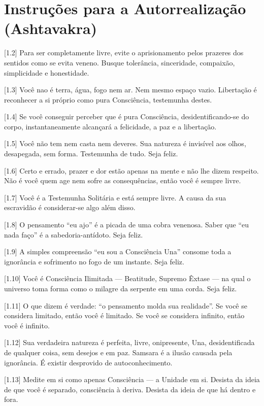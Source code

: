 \chapter[(Ashtavakra)]{Instruções para a Autorrealização (Ashtavakra)}

[1.2] Para ser completamente livre, evite o aprisionamento pelos prazeres dos sentidos como se evita veneno. Busque tolerância, sinceridade, compaixão, simplicidade e honestidade.

[1.3] Você nao é terra, água, fogo nem ar. Nem mesmo espaço vazio. Libertação é reconhecer a si próprio como pura Consciência, testemunha destes.

[1.4] Se você conseguir perceber que é pura Consciência, desidentificando-se do corpo, instantaneamente alcançará a felicidade, a paz e a libertação.

[1.5] Você não tem nem casta nem deveres. Sua natureza é invisível aos olhos, desapegada, sem forma. Testemunha de tudo. Seja feliz.

[1.6] Certo e errado, prazer e dor estão apenas na mente e não lhe dizem respeito. Não é você quem age nem sofre as consequências, então você é sempre livre.

[1.7] Você é a Testemunha Solitária e está sempre livre. A causa da sua escravidão é considerar-se algo além disso.

[1.8] O pensamento ``eu ajo'' é a picada de uma cobra venenosa. Saber que ``eu nada faço'' é a sabedoria-antídoto. Seja feliz.

[1.9] A simples compreensão ``eu sou a Consciência Una'' consome toda a ignorância e sofrimento no fogo de um instante. Seja feliz.

[1.10] Você é Consciência Ilimitada --- Beatitude, Supremo Êxtase --- na qual o universo toma forma como o milagre da serpente em uma corda. Seja feliz.

[1.11] O que dizem é verdade: ``o pensamento molda sua realidade''. Se você se considera limitado, então você é limitado. Se você se considera infinito, então você é infinito.

[1.12] Sua verdadeira natureza é perfeita, livre, onipresente, Una, desidentificada de qualquer coisa, sem desejos e em paz. Samsara é a ilusão causada pela ignorância. É existir desprovido de autoconhecimento.

[1.13] Medite em si como apenas Consciência --- a Unidade em si. Desista da ideia de que você é separado, consciência à deriva. Desista da ideia de que há dentro e fora.

